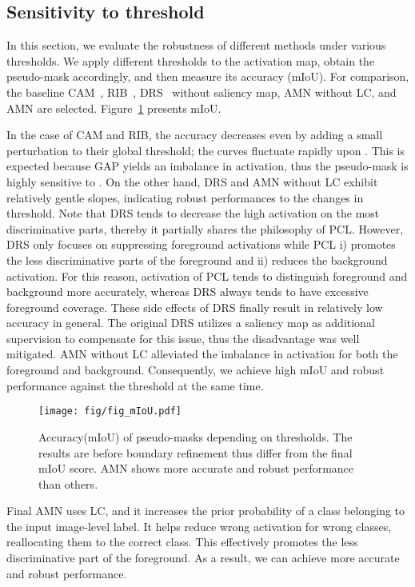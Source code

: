 \documentclass[10pt,twocolumn,letterpaper]{article}
\begin{document}
\subsection{Sensitivity to threshold}

 In this section, we evaluate the robustness of different methods under various thresholds. We apply different thresholds to the activation map, obtain the pseudo-mask accordingly, and then measure its accuracy (mIoU). For comparison, the baseline CAM~\cite{zhou2016learning}, RIB~\cite{lee2021reducing}, DRS~\cite{KimHK21DRS} without saliency map, AMN without LC, and AMN are selected. Figure~\ref{fig:miou} presents mIoU.

In the case of CAM and RIB, the accuracy decreases even by adding a small perturbation to their global threshold; the curves fluctuate rapidly upon . This is expected because GAP yields an imbalance in activation, thus the pseudo-mask is highly sensitive to . On the other hand, DRS and AMN without LC exhibit relatively gentle slopes, indicating robust performances to the changes in threshold. Note that DRS tends to decrease the high activation on the most discriminative parts, thereby it partially shares the philosophy of PCL. However, DRS only focuses on suppressing foreground activations while PCL i) promotes the less discriminative parts of the foreground and ii) reduces the background activation. For this reason, activation of PCL tends to distinguish foreground and background more accurately, whereas DRS always tends to have excessive foreground coverage. These side effects of DRS finally result in relatively low accuracy in general. The original DRS utilizes a saliency map as additional supervision to compensate for this issue, thus the disadvantage was well mitigated. AMN without LC alleviated the imbalance in activation for both the foreground and background. Consequently, we achieve high mIoU and robust performance against the threshold at the same time.

\begin{figure}[t]
\centering
\texttt{[image: fig/fig\_mIoU.pdf]}
\vspace{-6mm}
\caption{Accuracy(mIoU) of pseudo-masks depending on thresholds. The results are before boundary refinement thus differ from the final mIoU score. AMN shows more accurate and robust performance than others.}
\vspace{-3mm}
\label{fig:miou}
\end{figure} 
Final AMN uses LC, and it increases the prior probability of a class belonging to the input image-level label. It helps reduce wrong activation for wrong classes, reallocating them to the correct class. This effectively promotes the less discriminative part of the foreground. As a result, we can achieve more accurate and robust performance. 
\end{document}
